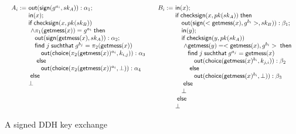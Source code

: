 \begin{figure}
\[
  \begin{array}{cc}
\begin{array}[t]{l@{~}l}
  A_i := & \myout{\mysign(g^{a_i},sk_A)} : \alpha_1; \\
         &\myin{x}; \\
         & \myif \mycsign(x,pk(sk_B)) \\
  & ~ \wedge \pi_1(\mygetmess(x))=g^{a_i}  \mythen \\
         & \quad \myout{\mysign(\mygetmess(x),sk_A) } : \alpha_2; \\
         & \quad \myfind j \mysuchthat g^{b_j} = \pi_2(\mygetmess(x)) \\
           & \qquad \myout{\diff{\pi_2(\mygetmess(x))^{a_i}}{k_{i,j}}} : \alpha_3\\
         & \quad \myelse \\
         & \qquad \myout{\diff{\pi_2(\mygetmess(x))^{a_i}}{\bot}}  : \alpha_4 \\
         & \myelse \\
           & \bot
\end{array}
&
\begin{array}[t]{l@{~}l}
  B_i := &\myin{x}; \\
         & \myif \mycsign(x,pk(sk_A)) \mythen \\
         & \quad \myout{\mysign(<\mygetmess(x), g^{b_i}>,sk_B)} : \beta_1; \\
         & \quad \myin{y}; \\
         & \quad \myif \mycsign(y,pk(sk_A))\\
  & \quad ~ \wedge \mygetmess(y) = <\mygetmess(x), g^{b_i}> \mythen \\
         & \quad \quad \myfind j \mysuchthat g^{a_j} = \mygetmess(x) \\
           & \quad \qquad \myout{\diff{\mygetmess(x)^{b_i}}{k_{j,i}}} : \beta_2 \\
         & \quad \quad \myelse \\
         & \quad \qquad \myout{\diff{\mygetmess(x)^{b_i}}{\bot}} : \beta_3 \\
         & \quad \myelse \\
           & \quad \bot \\
         & \myelse \\
           & \bot
\end{array}
\end{array}
\]
\label{fig:signed_ddh}
\caption{A signed DDH key exchange}
\end{figure}

